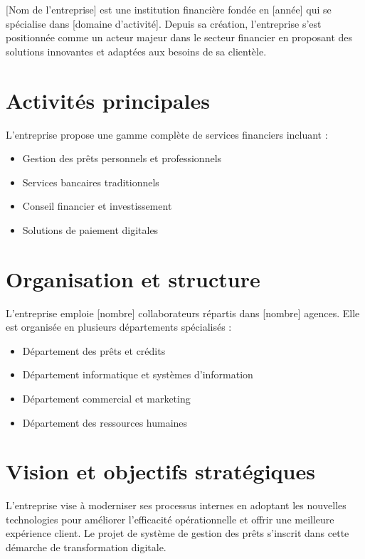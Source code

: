 \documentclass[12pt,a4paper]{report}
\begin{document}
[Nom de l'entreprise] est une institution financière fondée en [année] qui se spécialise dans [domaine d'activité]. Depuis sa création, l'entreprise s'est positionnée comme un acteur majeur dans le secteur financier en proposant des solutions innovantes et adaptées aux besoins de sa clientèle.

\section*{Activités principales}

L'entreprise propose une gamme complète de services financiers incluant :
\begin{itemize}
    \item Gestion des prêts personnels et professionnels
    \item Services bancaires traditionnels
    \item Conseil financier et investissement
    \item Solutions de paiement digitales
\end{itemize}

\section*{Organisation et structure}

L'entreprise emploie [nombre] collaborateurs répartis dans [nombre] agences. Elle est organisée en plusieurs départements spécialisés :
\begin{itemize}
    \item Département des prêts et crédits
    \item Département informatique et systèmes d'information
    \item Département commercial et marketing
    \item Département des ressources humaines
\end{itemize}

\section*{Vision et objectifs stratégiques}

L'entreprise vise à moderniser ses processus internes en adoptant les nouvelles technologies pour améliorer l'efficacité opérationnelle et offrir une meilleure expérience client. Le projet de système de gestion des prêts s'inscrit dans cette démarche de transformation digitale.

\newpage
\end{document}
